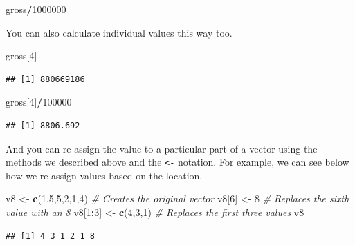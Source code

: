 \documentclass[
]{book}
\newenvironment{Shaded}{\begin{snugshade}}{\end{snugshade}}
\newcommand{\CommentTok}[1]{\textcolor[rgb]{0.56,0.35,0.01}{\textit{#1}}}
\newcommand{\DecValTok}[1]{\textcolor[rgb]{0.00,0.00,0.81}{#1}}
\newcommand{\KeywordTok}[1]{\textcolor[rgb]{0.13,0.29,0.53}{\textbf{#1}}}
\newcommand{\NormalTok}[1]{#1}
\newcommand{\OperatorTok}[1]{\textcolor[rgb]{0.81,0.36,0.00}{\textbf{#1}}}
\newcommand{\StringTok}[1]{\textcolor[rgb]{0.31,0.60,0.02}{#1}}
\begin{document}
\begin{Shaded}
\begin{Highlighting}[]
\NormalTok{gross}\OperatorTok{/}\DecValTok{1000000}
\end{Highlighting}
\end{Shaded}

You can also calculate individual values this way too.

\begin{Shaded}
\begin{Highlighting}[]
\NormalTok{gross[}\DecValTok{4}\NormalTok{]  }
\end{Highlighting}
\end{Shaded}

\begin{verbatim}
## [1] 880669186
\end{verbatim}

\begin{Shaded}
\begin{Highlighting}[]
\NormalTok{gross[}\DecValTok{4}\NormalTok{]}\OperatorTok{/}\DecValTok{100000}
\end{Highlighting}
\end{Shaded}

\begin{verbatim}
## [1] 8806.692
\end{verbatim}

And you can re-assign the value to a particular part of a vector using the methods we described above and the \texttt{\textless{}-} notation. For example, we can see below how we re-assign values based on the location.

\begin{Shaded}
\begin{Highlighting}[]
\NormalTok{v8 <-}\StringTok{ }\KeywordTok{c}\NormalTok{(}\DecValTok{1}\NormalTok{,}\DecValTok{5}\NormalTok{,}\DecValTok{5}\NormalTok{,}\DecValTok{2}\NormalTok{,}\DecValTok{1}\NormalTok{,}\DecValTok{4}\NormalTok{) }\CommentTok{# Creates the original vector}
\NormalTok{v8[}\DecValTok{6}\NormalTok{] <-}\StringTok{ }\DecValTok{8} \CommentTok{# Replaces the sixth value with an 8}
\NormalTok{v8[}\DecValTok{1}\OperatorTok{:}\DecValTok{3}\NormalTok{] <-}\StringTok{ }\KeywordTok{c}\NormalTok{(}\DecValTok{4}\NormalTok{,}\DecValTok{3}\NormalTok{,}\DecValTok{1}\NormalTok{) }\CommentTok{# Replaces the first three values}
\NormalTok{v8}
\end{Highlighting}
\end{Shaded}

\begin{verbatim}
## [1] 4 3 1 2 1 8
\end{verbatim}
\end{document}
